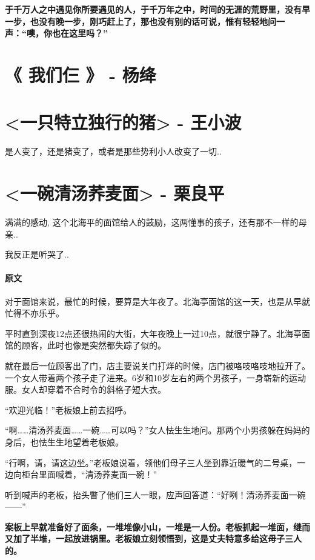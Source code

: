 \documentclass[UTF8,a4paper,8pt]{ctexbook}
\begin{document}
		\textbf{于千万人之中遇见你所要遇见的人，于千万年之中，时间的无涯的荒野里，没有早一步，也没有晚一步，刚巧赶上了，那也没有别的话可说，惟有轻轻地问一声：“噢，你也在这里吗？”}
	
     	\newpage
     \section{《 我们仨 》 - 杨绛}
     
	     \newpage
     \section{<一只特立独行的猪> - 王小波}
	     是人变了，还是猪变了，或者是那些势利小人改变了一切..
	     
		  \newpage
	 \section{<一碗清汤荞麦面> - 栗良平}
		  满满的感动, 这个北海平的面馆给人的鼓励，这两懂事的孩子，还有那不一样的母亲..
		  
		  我反正是听哭了..
		  
		  \paragraph{原文}
			  对于面馆来说，最忙的时候，要算是大年夜了。北海亭面馆的这一天，也是从早就忙得不亦乐乎。
			  
			  平时直到深夜12点还很热闹的大街，大年夜晚上一过10点，就很宁静了。北海亭面馆的顾客，此时也像是突然都失踪了似的。
			  
			  就在最后一位顾客出了门，店主要说关门打烊的时候，店门被咯吱咯吱地拉开了。一个女人带着两个孩子走了进来。6岁和10岁左右的两个男孩子，一身崭新的运动服。女人却穿着不合时令的斜格子短大衣。
			  
			  “欢迎光临！”老板娘上前去招呼。
			  
			  “啊……清汤荞麦面……一碗……可以吗？”女人怯生生地问。那两个小男孩躲在妈妈的身后，也怯生生地望着老板娘。
			  
			  “行啊，请，请这边坐。”老板娘说着，领他们母子三人坐到靠近暖气的二号桌，一边向柜台里面喊着，“清汤荞麦面一碗！”
			  
			  听到喊声的老板，抬头瞥了他们三人一眼，应声回答道：“好咧！清汤荞麦面一碗——”
			  
			  \textbf{案板上早就准备好了面条，一堆堆像小山，一堆是一人份。老板抓起一堆面，继而又加了半堆，一起放进锅里。老板娘立刻领悟到，这是丈夫特意多给这母子三人的。}
			  
\end{document}
